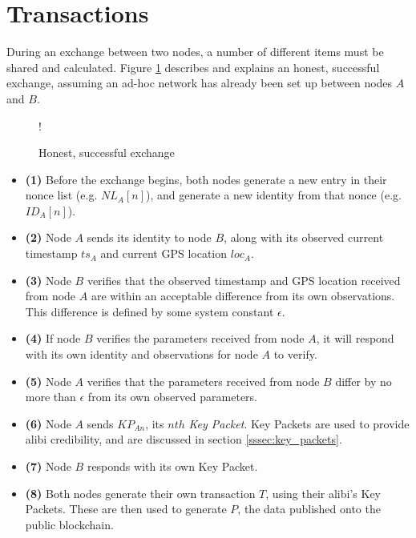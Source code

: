 \section{Transactions} \label{sec:transactions}
During an exchange between two nodes, a number of different items must be shared and calculated. Figure \ref{fig:transaction} describes and explains an honest, successful exchange, assuming an ad-hoc network has already been set up between nodes $A$ and $B$.

\begin{figure}[H]
\begin{center}
 {!} {}
\caption{Honest, successful exchange}
\label{fig:transaction}
\end{center}
\end{figure}

\begin{itemize}
	\item[] \textbf{(1)} Before the exchange begins, both nodes generate a new entry in their nonce list (e.g. $NL_A[n]$), and generate a new identity from that nonce (e.g. $ID_A[n]$).
	\item[] \textbf{(2)} Node $A$ sends its identity to node $B$, along with its observed current timestamp $ts_A$ and current GPS location $loc_A$.
	\item[] \textbf{(3)} Node $B$ verifies that the observed timestamp and GPS location received from node $A$ are within an acceptable difference from its own observations. This difference is defined by some system constant $\epsilon$.
	\item[] \textbf{(4)} If node $B$ verifies the parameters received from node $A$, it will respond with its own identity and observations for node $A$ to verify.
	\item[] \textbf{(5)} Node $A$ verifies that the parameters received from node $B$ differ by no more than $\epsilon$ from its own observed parameters.
	\item[] \textbf{(6)} Node $A$ sends $KP_{An}$, its $nth$ \textit{Key Packet}. Key Packets are used to provide alibi credibility, and are discussed in section \ref{sssec:key_packets}.
	\item[] \textbf{(7)} Node $B$ responds with its own Key Packet.
	\item[] \textbf{(8)} Both nodes generate their own transaction $T$, using their alibi's Key Packets. These are then used to generate $P$, the data published onto the public blockchain.
\end{itemize}


